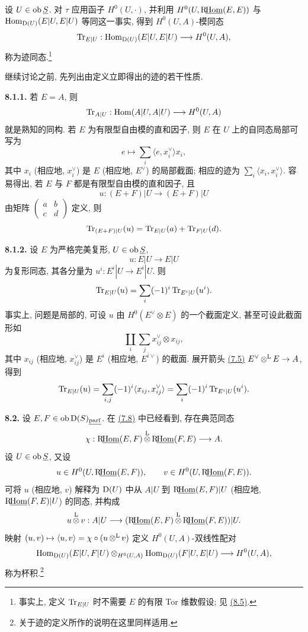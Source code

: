 设 \(U\in\operatorname{ob}\underline S\). 对 \(\tau\) 应用函子 \(H^0(U,\cdot)\), 并利用 \(H^0(U,\mathrm R\!\underline{\operatorname{Hom}}(E,E))\) 与 \(\operatorname{Hom}_{\mathrm D(U)}(E|U,E|U)\) 等同这一事实, 得到 \(H^0(U,A)\)-模同态
\[
  \operatorname{Tr}_{E|U}:\operatorname{Hom}_{\mathrm D(U)}(E|U,E|U)\longrightarrow H^0(U,A),
\]
称为迹同态.\footnote{事实上, 定义 \(\operatorname{Tr}_{E|U}\) 时不需要 \(E\) 的有限 Tor 维数假设; 见 \hyperlink{sga6.e01.rem.8-5}{(8.5)}.}

继续讨论之前, 先列出由定义立即得出的迹的若干性质.

\textbf{8.1.1.} 若 \(E=A\), 则
\[
  \operatorname{Tr}_{A|U}:\operatorname{Hom}(A|U,A|U)\longrightarrow H^0(U,A)
\]
就是熟知的同构. 若 \(E\) 为有限型自由模的直和因子, 则 \(E\) 在 \(U\) 上的自同态局部可写为
\[
  e\longmapsto \sum_i\langle e,x_i^\vee\rangle x_i,
\]
其中 \(x_i\) (相应地, \(x_i^\vee\)) 是 \(E\) (相应地, \(E^\vee\)) 的局部截面; 相应的迹为 \(\sum_i\langle x_i,x_i^\vee\rangle\). 容易得出, 若 \(E\) 与 \(F\) 都是有限型自由模的直和因子, 且
\[
  u:(E+F)|U\longrightarrow(E+F)|U
\]
由矩阵 \(\begin{pmatrix}a&b\\ c&d\end{pmatrix}\) 定义, 则
\[
  \operatorname{Tr}_{(E+F)|U}(u)=\operatorname{Tr}_{E|U}(a)+\operatorname{Tr}_{F|U}(d).
\]

\textbf{8.1.2.} 设 \(E\) 为严格完美复形, \(U\in\operatorname{ob}\underline S\),
\[
  u:E|U\longrightarrow E|U
\]
为复形同态, 其各分量为 \(u^i:E^i|U\to E^i|U\). 则
\[
  \operatorname{Tr}_{E|U}(u)=\sum_i(-1)^i\operatorname{Tr}_{E^i|U}(u^i).
\]
事实上, 问题是局部的, 可设 \(u\) 由 \(H^0(E^\vee\otimes E)\) 的一个截面定义, 甚至可设此截面形如
\[
  \coprod_i\sum_j x_{ij}^\vee\otimes x_{ij},
\]
其中 \(x_{ij}\) (相应地, \(x_{ij}^\vee\)) 是 \(E^i\) (相应地, \(E^{i\vee}\)) 的截面. 展开箭头 \hyperlink{sga6.e01.lem.7-5}{(7.5)} \(E^\vee\mathop{\otimes}^{\mathrm L} E\to A\), 得到
\[
  \operatorname{Tr}_{E|U}(u)=\sum_{i,j}(-1)^i\langle x_{ij},x_{ij}^\vee\rangle
  =\sum_i(-1)^i\operatorname{Tr}_{E^i|U}(u^i).
\]

\textbf{8.2.} 设 \(E,F\in\operatorname{ob}\mathrm D(S)_{\underline{\mathrm{parf}}}\). 在 \hyperlink{sga6.e01.cor.7-8}{(7.8)} 中已经看到, 存在典范同态
\[
  \chi:\mathrm R\!\underline{\operatorname{Hom}}(E,F)\mathop{\otimes}^{\mathrm L}\mathrm R\!\underline{\operatorname{Hom}}(F,E)\longrightarrow A.
\]
设 \(U\in\operatorname{ob}\underline S\), 又设
\[
  u\in H^0(U,\mathrm R\!\underline{\operatorname{Hom}}(E,F)),\qquad v\in H^0(U,\mathrm R\!\underline{\operatorname{Hom}}(F,E)).
\]
可将 \(u\) (相应地, \(v\)) 解释为 \(\mathrm D(U)\) 中从 \(A|U\) 到 \(\mathrm R\!\underline{\operatorname{Hom}}(E,F)|U\) (相应地, \(\mathrm R\!\underline{\operatorname{Hom}}(F,E)|U\)) 的同态, 并构成
\[
  u\mathop{\otimes}^{\mathrm L} v:A|U\longrightarrow(\mathrm R\!\underline{\operatorname{Hom}}(E,F)\mathop{\otimes}^{\mathrm L}\mathrm R\!\underline{\operatorname{Hom}}(F,E))|U.
\]
映射 \((u,v)\mapsto\langle u,v\rangle=\chi\circ(u\mathop{\otimes}^{\mathrm L} v)\) 定义 \(H^0(U,A)\)-双线性配对
\[
  \operatorname{Hom}_{\mathrm D(U)}(E|U,F|U)\otimes_{H^0(U,A)}\operatorname{Hom}_{\mathrm D(U)}(F|U,E|U)
  \longrightarrow H^0(U,A),
\]
称为杯积.\footnote{关于迹的定义所作的说明在这里同样适用.}


